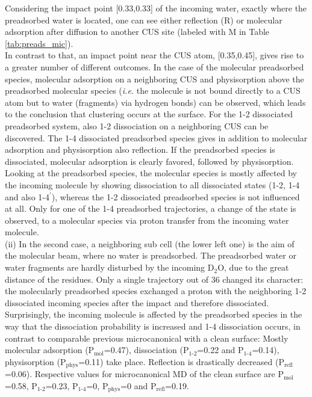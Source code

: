 \documentclass[11pt,DIV=13,BCOR=5mm,a4paper,headinclude]{scrbook}
\begin{document}
Considering the impact point [0.33,0.33] of the incoming water, exactly where the preadsorbed water is located, one can see either reflection (R) or molecular adsorption after diffusion to another CUS site (labeled with M in Table \ref{tab:preads_mic}).\\
In contrast to that, an impact point near the CUS atom, [0.35,0.45], gives rise to a greater number of different outcomes.
In the case of the molecular preadsorbed species, molecular adsorption on a neighboring CUS and physisorption above the preadsorbed molecular species (\textit{i.e.} the molecule is not bound directly to a CUS atom but  to water (fragments) via hydrogen bonds) can be observed, which leads to the conclusion that clustering occurs at the surface.
For the 1-2 dissociated preadsorbed system, also 1-2 dissociation on a neighboring CUS can be discovered.
The 1-4 dissociated preadsorbed species gives in addition to molecular adsorption and physisorption also reflection.
If the preadsorbed species is dissociated, molecular adsorption is clearly favored, followed by physisorption.
\\
Looking at the preadsorbed species, the molecular species is mostly affected by the incoming molecule by showing dissociation to all dissociated states (1-2, 1-4 and also 1-4$^\prime$), whereas the 1-2 dissociated preadsorbed species is not influenced at all.
Only for one of the 1-4 preadsorbed trajectories, a change of the state is observed, to a molecular species via proton transfer from the incoming water molecule.
\\
(ii) In the second case, a neighboring sub cell (the lower left one) is the aim of the molecular beam, where no water is preadsorbed.
The preadsorbed water or water fragments are hardly disturbed by the incoming D$_2$O, due to the great distance of the residues.
Only a single trajectory out of 36 changed its character: the molecularly preadsorbed species exchanged a proton with the neighboring 1-2 dissociated incoming species after the impact and therefore dissociated.
\\
Surprisingly, the incoming molecule is affected by the preadsorbed species in the way that  the dissociation probability is increased and 1-4 dissociation occurs, in contrast to comparable previous microcanonical with a clean surface: Mostly molecular adsorption (P$_\textrm{mol}$=0.47), dissociation (P$_\textrm{1-2}$=0.22 and P$_\textrm{1-4}$=0.14), physisorption (P$_\textrm{phys}$=0.11) take place.
Reflection is drastically decreased (P$_\textrm{refl}$=0.06).
Respective values for microcanonical MD of the clean surface are P$_\textrm{mol}$=0.58, P$_\textrm{1-2}$=0.23, P$_\textrm{1-4}$=0, P$_\textrm{phys}$=0 and P$_\textrm{refl}$=0.19.
\end{document}
